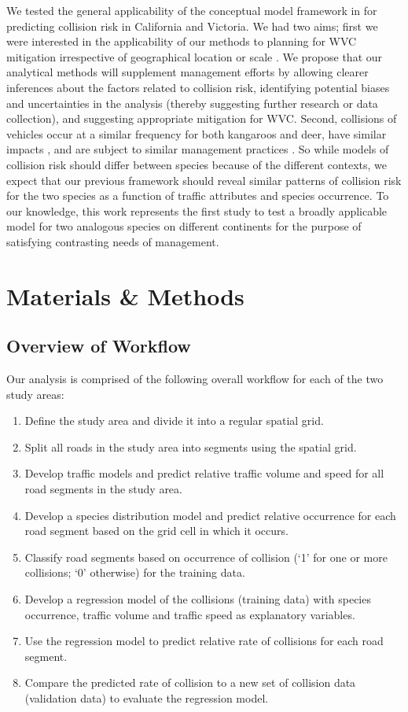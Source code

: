 We tested the general applicability of the conceptual model framework in  for predicting collision risk in California and Victoria.  We had two aims; first we were interested in the applicability of our methods to planning for WVC mitigation irrespective of geographical location or scale \citep[see][]{rvdr11}.  We propose that our analytical methods will supplement management efforts by allowing clearer inferences about the factors related to collision risk, identifying potential biases and uncertainties in the analysis (thereby suggesting further research or data collection), and suggesting appropriate mitigation for WVC.  Second, collisions of vehicles occur at a similar frequency for both kangaroos and deer, have similar impacts \citep{lang08}, and are subject to similar management practices \citep{mcsh97,crof04}.  So while models of collision risk should differ between species because of the different contexts, we expect that our previous framework should reveal similar patterns of collision risk for the two species as a function of traffic attributes and species occurrence.  To our knowledge, this work represents the first study to test a broadly applicable model for two analogous species on different continents for the purpose of satisfying contrasting needs of management.

\section{Materials \& Methods}

\subsection{Overview of Workflow}

Our analysis is comprised of the following overall workflow for each of the two study areas:

\begin{enumerate}
	\item Define the study area and divide it into a regular spatial grid.
	\item Split all roads in the study area into segments using the spatial grid.
	\item Develop traffic models and predict relative traffic volume and speed for all road segments in the study area.
	\item Develop a species distribution model and predict relative occurrence for each road segment based on the grid cell in which it occurs.
	\item Classify road segments based on occurrence of collision (`1' for one or more collisions; `0' otherwise) for the training data.
	\item Develop a regression model of the collisions (training data) with species occurrence, traffic volume and traffic speed as explanatory variables.
	\item Use the regression model to predict relative rate of collisions for each road segment.
	\item Compare the predicted rate of collision to a new set of collision data (validation data) to evaluate the regression model.
\end{enumerate}	

